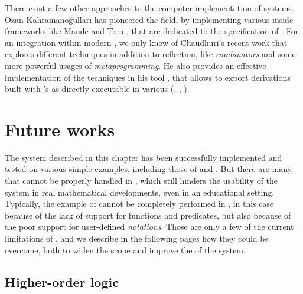 \begin{remark}
  There exist a few other approaches to the computer implementation of  systems. Ozan Kahramanoğulları has pioneered the field, by
  implementing various  inside frameworks like Maude
  \cite{kahramanogullari_maude_2008} and Tom
  \cite{kahramanogullari_implementing_2005}, that are dedicated to the
  specification of . For an integration within modern
  , we only know of Chaudhuri's recent work
   that explores different techniques in
  addition to reflection, like \emph{combinators} and some more powerful usages
  of \emph{metaprogramming}. He also provides an effective implementation of the
  techniques in his  tool \cite{DBLP:conf/cade/Chaudhuri21}, that
  allows to export  derivations built with 's
   as  directly executable in various  (, , ).
\end{remark}

\section{Future works}

The  system described in this chapter has been successfully
implemented and tested on various simple examples, including those of
 and . But there are many   that cannot be
properly handled in , which still hinders the usability of the system in
real mathematical developments, even in an educational setting. Typically, the
example of  cannot be completely performed in , in this case
because of the lack of support for \emph{} functions and predicates,
but also because of the poor support for user-defined \emph{notations}. Those
are only a few of the current limitations of , and we
describe in the following pages how they could be overcome, both to widen the
scope and improve the  of the system.

\subsection{Higher-order logic}

